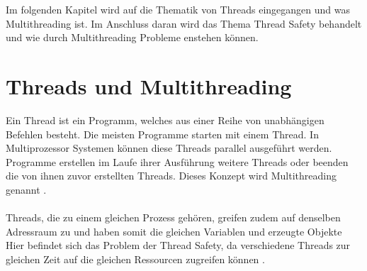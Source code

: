 Im folgenden Kapitel wird auf die Thematik von Threads eingegangen und was Multithreading ist. Im Anschluss daran wird das Thema Thread Safety behandelt und wie durch Multithreading Probleme enstehen können. 

\section{Threads und Multithreading}\label{sec:threads}

Ein Thread ist ein Programm, welches aus einer Reihe von unabhängigen Befehlen besteht. Die meisten Programme starten mit einem Thread. In Multiprozessor Systemen können diese Threads parallel ausgeführt werden. Programme erstellen im Laufe ihrer Ausführung weitere Threads oder beenden die von ihnen zuvor erstellten Threads. Dieses Konzept wird Multithreading genannt \cite[vgl.][70]{banerjee_theory_2006}.\\
\\
Threads, die zu einem gleichen Prozess gehören, greifen zudem auf denselben Adressraum zu und haben somit die gleichen Variablen und erzeugte Objekte Hier befindet sich das Problem der Thread Safety, da verschiedene Threads zur gleichen Zeit auf die gleichen Ressourcen zugreifen können \cite[vgl.][2]{brian}.
